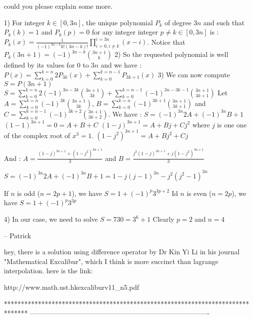 \begin{solution}
	\begin{tcolorbox}could you please explain some more.\end{tcolorbox}

1) For integer $k\in[0,3n]$, the unique polynomial $P_{k}$ of degree $3n$ and such that $P_{k}(k)=1$  and $P_{k}(p)=0$ for any integer integer $p\neq k\in[0,3n]$ is :
$P_{k}(x)=\frac{1}{(-1)^{3n-k}k!(3n-k)!}\prod_{i=0,i\neq k}^{i=3n}(x-i)$. Notice that $P_{k}(3n+1)=(-1)^{3n-k}\binom{3n+1}{k}$
2) So the requested polynomial is well defined by its values for 0 to $3n$ and we have :
$P(x)=\sum_{k=0}^{k=n}2P_{3k}(x)+\sum_{k=0}^{k=n-1}P_{3k+1}(x)$
3) We can now compute $S=P(3n+1)$
$S=\sum_{k=0}^{k=n}2(-1)^{3n-3k}\binom{3n+1}{3k}+\sum_{k=0}^{k=n-1}(-1)^{3n-3k-1}\binom{3n+1}{3k+1}$
Let $A=\sum_{k=0}^{k=n}(-1)^{3k}\binom{3n+1}{3k}$, $B=\sum_{k=0}^{k=n}(-1)^{3k+1}\binom{3n+1}{3k+1}$ and $C=\sum_{k=0}^{k=n-1}(-1)^{3k+2}\binom{3n+1}{3k+2}$. We have :
$S=(-1)^{3n}2A+(-1)^{3n}B+1$
$(1-1)^{3n+1}=0=A+B+C$
$(1-j)^{3n+1}=A+Bj+Cj^{2}$ where $j$ is one one of the complex root of $x^{3}=1$.
$(1-j^{2})^{3n+1}=A+Bj^{2}+Cj$

And : $A=\frac{(1-j)^{3n+1}+(1-j^{2})^{3n+1}}{3}$ and $B=\frac{j^{2}(1-j)^{3n+1}+j(1-j^{2})^{3n+1}}{3}$

$S=(-1)^{3n}2A+(-1)^{3n}B+1=1-j(j-1)^{3n}-j^{2}(j^{2}-1)^{3n}$

If $n$ is odd ($n=2p+1$), we have $S=1+(-1)^{p}3^{3p+2}$
Id $n$ is even ($n=2p$), we have $S=1+(-1)^{p}3^{3p}$

4) In our case, we need to solve $S=730=3^{6}+1$
Clearly $p=2$ and $n=4$

-- 
Patrick
\end{solution}



\begin{solution}
	hey, there is a solution using difference operator by Dr Kin Yi Li in his journal "Mathematical Excalibur", which I think is more succinct than lagrange interpolation. here is the link:

http://www.math.ust.hk\/excalibur\/v11_n5.pdf
\end{solution}
*******************************************************************************
-------------------------------------------------------------------------------

